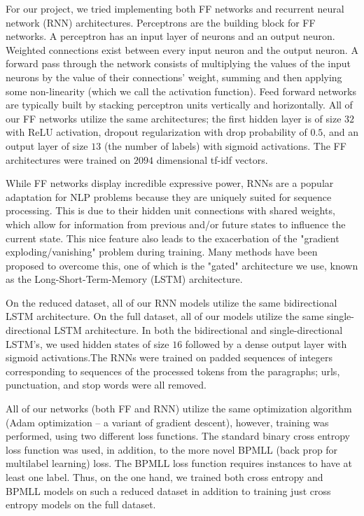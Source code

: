 \documentclass[11pt]{article}
\begin{document}
For our project, we tried implementing both FF networks and recurrent neural network (RNN) architectures. Perceptrons are the building block for FF networks. A perceptron has an input layer of neurons and an output neuron. Weighted connections exist between every input neuron and the output neuron. A forward pass through the network consists of multiplying the values of the input neurons by the value of their connections' weight, summing and then applying some non-linearity (which we call the activation function). Feed forward networks are typically built by stacking perceptron units vertically and horizontally. All of our FF networks utilize the same architectures; the first hidden layer is of size $32$ with ReLU activation, dropout regularization with drop probability of $0.5$, and an output layer of size $13$ (the number of labels) with sigmoid activations. The FF architectures were trained on $2094$ dimensional tf-idf vectors. 

While FF networks display incredible expressive power, RNNs are a popular adaptation for NLP problems because they are uniquely suited for sequence processing. This is due to their hidden unit connections with shared weights, which allow for information from previous and/or future states to influence the current state. This nice feature also leads to the exacerbation of the "gradient exploding/vanishing" problem during training. Many methods have been proposed to overcome this, one of which is the "gated" architecture we use, known as the Long-Short-Term-Memory (LSTM) architecture. 

On the reduced dataset, all of our RNN models utilize the same bidirectional LSTM architecture. On the full dataset, all of our models utilize the same single-directional LSTM architecture. In both the bidirectional and single-directional LSTM's, we used hidden states of size $16$ followed by a dense output layer with sigmoid activations.The RNNs were trained on padded sequences of integers corresponding to sequences of the processed tokens from the paragraphs; urls, punctuation, and stop words were all removed. 

All of our networks (both FF and RNN) utilize the same optimization algorithm (Adam optimization -- a variant of gradient descent), however, training was performed, using two different loss functions. The standard binary cross entropy loss function was used, in addition, to the more novel BPMLL (back prop for multilabel learning) loss. The BPMLL loss function requires instances to have at least one label. Thus, on the one hand, we trained both cross entropy and BPMLL models on such a reduced dataset in addition to training just cross entropy models on the full dataset. 
\end{document}
